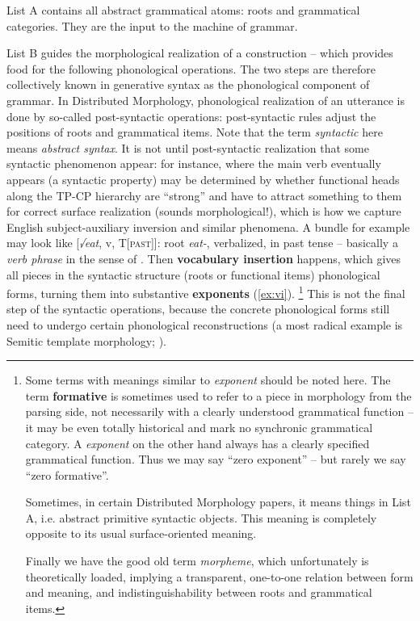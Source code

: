 \documentclass[a4paper, oneside, scheme=plain, 12pt]{article}
\newcommand*{\concept}[1]{\textbf{#1}}
\newcommand*{\term}[1]{\emph{#1}}
\newcommand{\form}[1]{\emph{#1}}
\newcommand*{\category}[1]{\textsc{#1}}
\begin{document}
List A contains all abstract grammatical atoms:
roots and grammatical categories.
They are the input to the machine of grammar.


List B guides the morphological realization of a construction --
which provides food for the following phonological operations.
The two steps are therefore collectively known in generative syntax as the phonological component of grammar.
In Distributed Morphology, phonological realization of an utterance
is done by so-called post-syntactic operations:
post-syntactic rules adjust the positions of roots and grammatical items.
Note that the term \term{syntactic} here means \emph{abstract syntax}.
It is not until post-syntactic realization that some syntactic phenomenon appear:
for instance, where the main verb eventually appears (a syntactic property) may be determined by
whether functional heads along the TP-CP hierarchy are ``strong''
and have to attract something to them for correct surface realization
(sounds morphological!),
which is how we capture English subject-auxiliary inversion and similar phenomena.
A bundle for example may look like [\form{√eat}, v, T[\category{past}]]:
root \form{eat-}, verbalized, in past tense -- basically a \term{verb phrase}
in the sense of .
Then \concept{vocabulary insertion} happens,
which gives all pieces in the syntactic structure (roots or functional items) phonological forms,
turning them into substantive \concept{exponents} (\ref{ex:vi}).%
\footnote{
    Some terms with meanings similar to \term{exponent} should be noted here.
    The term \concept{formative} is sometimes used to refer to a piece in morphology from the parsing side, not necessarily with a clearly understood grammatical function --
    it may be even totally historical and mark no synchronic grammatical category.
    A \term{exponent} on the other hand always has a clearly specified grammatical function.
    Thus we may say ``zero exponent'' -- but rarely we say ``zero formative''.

    Sometimes, in certain Distributed Morphology papers, it means things in List A,
    i.e. abstract primitive syntactic objects. 
    This meaning is completely opposite to its usual surface-oriented meaning.

    Finally we have the good old term \term{morpheme},
    which unfortunately is theoretically loaded, implying a transparent,
    one-to-one relation between form and meaning,
    and indistinguishability between roots and grammatical items.
}
This is not the final step of the syntactic operations,
because the concrete phonological forms still need to undergo certain phonological reconstructions
(a most radical example is Semitic template morphology; \citealt{tucker2011morphosyntax}).
\end{document}
